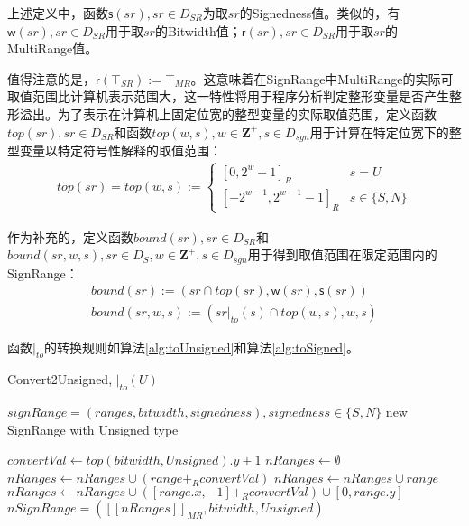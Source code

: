 上述定义中，函数$ \mathsf{s}(sr), sr \in D_{SR}$为取$ sr $的Signedness值。类似的，有$ \mathsf{w}(sr), sr \in D_{SR} $用于取$ sr $的Bitwidth值；$ \mathsf{r}(sr), sr \in D_{SR} $用于取$ sr $的MultiRange值。


值得注意的是，$ \mathsf{r}(\top_{SR}) := \top_{MR} $。这意味着在SignRange中MultiRange的实际可取值范围比计算机表示范围大，这一特性将用于程序分析判定整形变量是否产生整形溢出。为了表示在计算机上固定位宽的整型变量的实际取值范围，定义函数$ top(sr), sr \in D_{SR} $和函数$ top(w, s), w \in \mathbf{Z^+}, s \in D_{sgn} $用于计算在特定位宽下的整型变量以特定符号性解释的取值范围：
\begin{align}
	top(sr)  = top(w, s):=  \begin{cases}
		[0, 2^{w} - 1]_{R} & s = U\\
		[-2^{w - 1}, 2^{w - 1} - 1]_{R} & s \in \{S, N\}
	\end{cases}
\end{align}

作为补充的，定义函数$ bound(sr), sr \in D_{SR}$和$ bound(sr, w, s), sr \in D_S, w \in \mathbf{Z^+}, s \in D_{sgn}  $用于得到取值范围在限定范围内的SignRange：
\begin{align}
	bound(sr) := (sr \cap top(sr), \mathsf{w}(sr), \mathsf{s}(sr))\\
	bound(sr, w, s) := (sr|_{to}(s) \cap top(w, s), w, s)
\end{align}

函数$ |_{to} $的转换规则如算法\ref{alg:toUnsigned}和算法\ref{alg:toSigned}。

\begin{breakablealgorithm}
	\caption{Convert2Unsigned, $ |_{to}(U) $}
	\label{alg:toUnsigned}
	\begin{algorithmic}[1]
		
		\Require $ signRange = (ranges, bitwidth, signedness) , signedness \in \{S, N\}$
		\Ensure new SignRange with Unsigned type
		
		\State $ convertVal \gets top(bitwidth, Unsigned).y + 1 $
		\State $ nRanges \gets \emptyset $
				\State $ nRanges \gets nRanges \cup (range +_R convertVal) $
				\State $ nRanges \gets nRanges \cup range $
			\Else
				\State $ nRanges \gets nRanges \cup ([range.x, -1] +_R convertVal) \cup [0, range.y] $
			\EndIf
		\EndFor
		\\\Return $ nSignRange = ([[nRanges]]_{MR}, bitwidth, Unsigned) $
	\end{algorithmic}
\end{breakablealgorithm}

